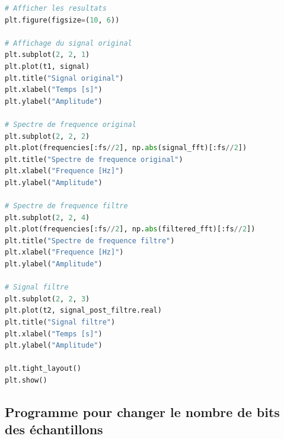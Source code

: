 ﻿\documentclass[11pt,letterpaper]{article}
\begin{document}
\begin{lstlisting}[language=python]
# Afficher les resultats
plt.figure(figsize=(10, 6))

# Affichage du signal original
plt.subplot(2, 2, 1)
plt.plot(t1, signal)
plt.title("Signal original")
plt.xlabel("Temps [s]")
plt.ylabel("Amplitude")

# Spectre de frequence original
plt.subplot(2, 2, 2)
plt.plot(frequencies[:fs//2], np.abs(signal_fft)[:fs//2])
plt.title("Spectre de frequence original")
plt.xlabel("Frequence [Hz]")
plt.ylabel("Amplitude")

# Spectre de frequence filtre
plt.subplot(2, 2, 4)
plt.plot(frequencies[:fs//2], np.abs(filtered_fft)[:fs//2])
plt.title("Spectre de frequence filtre")
plt.xlabel("Frequence [Hz]")
plt.ylabel("Amplitude")

# Signal filtre
plt.subplot(2, 2, 3)
plt.plot(t2, signal_post_filtre.real)
plt.title("Signal filtre")
plt.xlabel("Temps [s]")
plt.ylabel("Amplitude")

plt.tight_layout()
plt.show()
\end{lstlisting}

\subsection{Programme pour changer le nombre de bits des échantillons}
\end{document}
